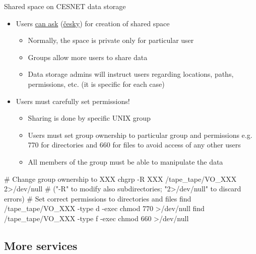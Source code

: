 \documentclass[compress, ucs, xelatex, 11pt, xcolor=svgnames, aspectratio=169,
	hyperref={
		bookmarks=true,
		unicode=true,
		colorlinks=true,
		pdftitle={Linux, command line and MetaCentrum},
		plainpages=false,
		pdfauthor={Vojtech Zeisek},
		pdfsubject={Course about use of Linux command line, writing shell scripts and using MetaCentrum of CESNET},
		pdfcreator={XeLaTeX},
		pdfkeywords={Linux, GNU, BASH, shell, command line, MetaCentrum},
		linkcolor=DarkRed, %
		anchorcolor=DarkBlue, %
		citecolor=Indigo, %
		filecolor=NavyBlue, %
		menucolor=DarkMagenta, %
		urlcolor=DarkBlue, %
		pdftex},
	url={hyphens, lowtilde} %
	]{beamer}
\begin{document}
\begin{frame}[fragile]{Shared space on CESNET data storage}
	\begin{itemize}
		\item Users \href{https://du.cesnet.cz/en/uzivatelska_podpora/start}{can ask} (\href{https://du.cesnet.cz/cs/uzivatelska_podpora/start}{česky}) for creation of shared space
		\begin{itemize}
			\item Normally, the space is private only for particular user
			\item Groups allow more users to share data
			\item Data storage admins will instruct users regarding locations, paths, permissions, etc. (it is specific for each case)
		\end{itemize}
		\item Users must carefully set permissions!
		\begin{itemize}
			\item Sharing is done by specific UNIX group
			\item Users must set group ownership to particular group and permissions e.g. 770 for directories and 660 for files to avoid access of any other users
			\item All members of the group must be able to manipulate the data
		\end{itemize}
	\end{itemize}
	\vfill
	\begin{bashcode}
    # Change group ownership to XXX
    chgrp -R XXX /tape_tape/VO_XXX 2>/dev/null
    # ("-R" to modify also subdirectories; "2>/dev/null" to discard errors)
    # Set correct permissions to directories and files
    find /tape_tape/VO_XXX -type d -exec chmod 770 {} >/dev/null
    find /tape_tape/VO_XXX -type f -exec chmod 660 {} >/dev/null
	\end{bashcode}
\end{frame}

\subsection{More services}
\end{document}
